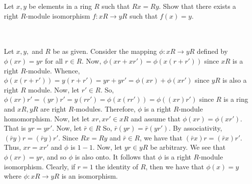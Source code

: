 Let $x, y$ be elements in a ring $R$ such that $Rx=Ry$. Show that there exists a right $R$-module
isomorphism $f:xR\rightarrow yR$ such that $f(x)=y$.\\\\

\begin{solution}\renewcommand{\qedsymbol}{}\ \\
    Let $x, y, $ and $R$ be as given. Consider the mapping $\phi:xR\rightarrow yR$ defined by
    $\phi(xr)=yr$ for all $r\in R$. Now, $\phi(xr+xr')=\phi(x(r+r'))$ since $xR$ is a right $R$-module.
    Whence, $\phi(x(r+r'))=y(r+r')=yr+yr'=\phi(xr)+\phi(xr')$ since $yR$ is also a right $R$ module.
    Now, let $r'\in R$. So, $\phi(xr)r'=(yr)r'=y(rr')=\phi(x(rr'))=\phi((xr)r')$ since $R$ is a ring and
    $xR, yR$ are right $R$-modules. Therefore, $\phi$ is a right $R$-module homomorphism. Now, let let
    $xr, xr'\in xR$ and assume that $\phi(xr)=\phi(xr')$. That is $yr=yr'$. Now, let $\bar{r}\in R$ So,
    $\bar{r}(yr)=\bar{r}(yr')$. By associativity, $(\bar{r}y)r=(\bar{r}y)r'$. Since $Rx=Ry$ and
    $\bar{r}\in R$, we have that $(\bar{r}x)r=(\bar{r}x)r'$. Thus, $xr=xr'$ and $\phi$ is $1-1$. Now,
    let $yr\in yR$ be arbitrary. We see that $\phi(xr)=yr$, and so $\phi$ is also onto. It follows that
    $\phi$ is a right $R$-module isomorphism. Clearly, if $r=1$ the identity of $R$, then we have that
    $\phi(x)=y$ where $\phi:xR\rightarrow yR$ is an isomorphism.

\end{solution}